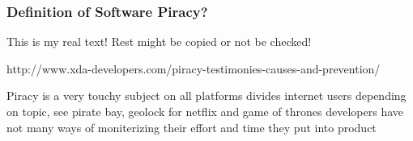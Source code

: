 \subsubsection{Definition of Software Piracy?} \label{subsubsection:foundation-piracy-overview-definition}
This is my real text! Rest might be copied or not be checked!


http://www.xda-developers.com/piracy-testimonies-causes-and-prevention/


Piracy is a very touchy subject on all platforms
divides internet users depending on topic, see pirate bay, geolock for netflix and game of thrones
developers have not many ways of moniterizing their effort and time they put into product
